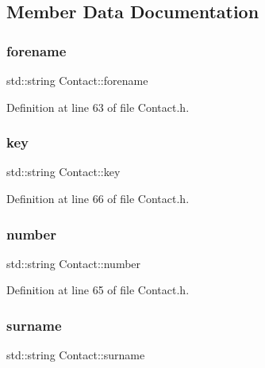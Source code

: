 \subsection{Member Data Documentation}
\mbox{\label{class_contact_af64e25f3271abad7970293e6adfdf457}} 
\subsubsection{\texorpdfstring{forename}{forename}}
{\footnotesize\ttfamily std\+::string Contact\+::forename\hspace{0.3cm}{\ttfamily [private]}}



Definition at line 63 of file Contact.\+h.

\mbox{\label{class_contact_a5bc7925e6356e29c9cbad7266f0a4340}} 
\subsubsection{\texorpdfstring{key}{key}}
{\footnotesize\ttfamily std\+::string Contact\+::key\hspace{0.3cm}{\ttfamily [private]}}



Definition at line 66 of file Contact.\+h.

\mbox{\label{class_contact_abd24eed27b661da4ab20553443212437}} 
\subsubsection{\texorpdfstring{number}{number}}
{\footnotesize\ttfamily std\+::string Contact\+::number\hspace{0.3cm}{\ttfamily [private]}}



Definition at line 65 of file Contact.\+h.

\mbox{\label{class_contact_a22518b332de3bd09ed94eb4d9de54894}} 
\subsubsection{\texorpdfstring{surname}{surname}}
{\footnotesize\ttfamily std\+::string Contact\+::surname\hspace{0.3cm}{\ttfamily [private]}}



